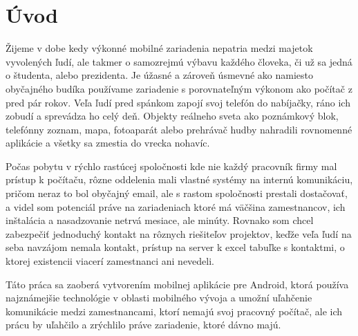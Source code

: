 \chapter*{Úvod}

Žijeme v dobe kedy výkonné mobilné zariadenia nepatria medzi majetok vyvolených ľudí, ale takmer o samozrejmú výbavu každého človeka, či už sa jedná o študenta, alebo prezidenta. Je úžasné a zároveň úsmevné ako namiesto obyčajného budíka používame zariadenie s porovnateľným výkonom ako počítač z pred pár rokov. Veľa ľudí pred spánkom zapojí svoj telefón do nabíjačky, ráno ich zobudí a sprevádza ho celý deň. Objekty reálneho sveta ako poznámkový blok, telefónny zoznam, mapa, fotoaparát alebo prehrávač hudby nahradili rovnomenné aplikácie a všetky sa zmestia do vrecka nohavíc. 

Počas pobytu v rýchlo rastúcej spoločnosti kde nie každý pracovník firmy mal prístup k počítaču, rôzne oddelenia mali vlastné systémy na internú komunikáciu, pričom neraz to bol obyčajný email, ale s rastom spoločnosti prestali dostačovať, a videl som potenciál práve na zariadeniach ktoré má väčšina zamestnancov, ich inštalácia a nasadzovanie netrvá mesiace, ale minúty. Rovnako som chcel zabezpečiť jednoduchý kontakt na rôznych riešiteľov projektov, keďže  veľa ľudí na seba navzájom nemala kontakt, prístup na server k excel tabuľke s kontaktmi, o ktorej existencii viacerí zamestnanci ani nevedeli. 


\vspace{10pt}
Táto práca sa zaoberá vytvorením mobilnej aplikácie pre Android, ktorá používa najznámejšie technológie v oblasti mobilného vývoja a umožní uľahčenie komunikácie medzi zamestnancami, ktorí nemajú svoj pracovný počítač, ale ich prácu by uľahčilo a zrýchlilo práve zariadenie, ktoré dávno majú.